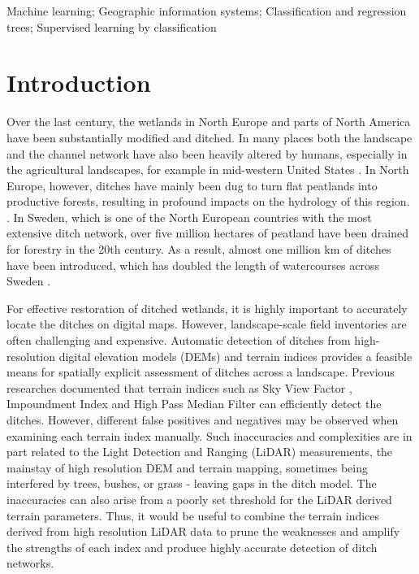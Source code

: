 \documentclass[]{interact}
\theoremstyle{plain}%
\theoremstyle{definition}
\theoremstyle{remark}
\begin{document}
\begin{keywords}
Machine learning; Geographic information systems; Classification and regression trees; Supervised learning by classification
\end{keywords}


\section{Introduction} \label{introduction}

Over the last century, the wetlands in North Europe and parts of North America have been substantially modified and ditched. In many places both the landscape and the channel network have also been heavily altered  by humans, especially in the agricultural landscapes, for example in mid-western United States \citep{passalacqua}. In North Europe, however, ditches have mainly been dug to turn flat peatlands into productive forests, resulting in profound impacts on the hydrology of this region. \citep{peatlands}. In Sweden, which is one of the North European countries with the most extensive ditch network, over five million hectares of peatland have been drained for forestry in the 20th century.  As a result, almost one million km of ditches have been introduced, which has doubled the length of watercourses across Sweden  \citep{hasselquist}.

For effective restoration of ditched wetlands, it is highly important  to accurately locate the ditches on digital maps. However, landscape-scale field inventories are often challenging and expensive. Automatic detection of ditches from high-resolution digital elevation models (DEMs) and terrain indices provides a feasible means for spatially explicit assessment of ditches across a landscape. Previous researches  \citep{uppsala} documented  that terrain indices such as Sky View Factor \citep{zaksek}, Impoundment Index \citep{whiteboxtools} and High Pass Median Filter \citep{whiteboxtools} can efficiently  detect the ditches. However, different false positives and negatives may be observed when examining each terrain index manually. Such inaccuracies and complexities are in part related to the Light Detection and Ranging (LiDAR) measurements, the mainstay of high resolution DEM and terrain mapping, sometimes being interfered by trees, bushes, or grass - leaving gaps in the ditch model. The inaccuracies can also arise from a poorly set threshold for the LiDAR derived terrain parameters. Thus, it would be useful to combine the terrain indices derived from high resolution LiDAR data to prune the weaknesses and amplify the strengths of each index and produce highly accurate detection of ditch networks.
\end{document}

